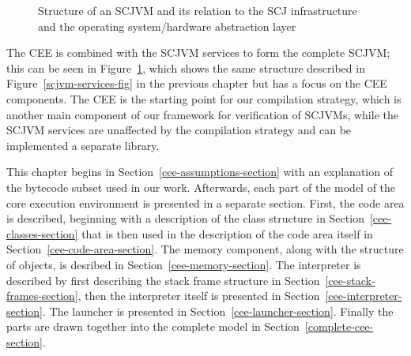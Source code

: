 \documentclass[a4paper,10pt]{report}
\begin{document}
\begin{figure}[ht]
  \caption{Structure of an SCJVM and its relation to the SCJ
    infrastructure and the operating system/hardware abstraction
    layer}
  \label{cee-fig}
\end{figure}

The CEE is combined with the SCJVM services to form the complete
SCJVM; this can be seen in Figure~\ref{cee-fig}, which shows the same
structure described in Figure~\ref{scjvm-services-fig} in the previous
chapter but has a focus on the CEE components.
The CEE is the starting point for our compilation strategy, which is
another main component of our framework for verification of SCJVMs,
while the SCJVM services are unaffected by the compilation strategy
and can be implemented a separate library.

This chapter begins in Section~\ref{cee-assumptions-section} with an
explanation of the bytecode subset used in our work.
Afterwards, each part of the \Circus{} model of the core execution
environment is presented in a separate section.
First, the code area is described, beginning with a description of the
class structure in Section~\ref{cee-classes-section} that is then used
in the description of the code area itself in
Section~\ref{cee-code-area-section}.
The memory component, along with the structure of objects, is desribed
in Section~\ref{cee-memory-section}.
The interpreter is described by first describing the stack frame
structure in Section~\ref{cee-stack-frames-section}, then the
interpreter itself is presented in
Section~\ref{cee-interpreter-section}.
The launcher is presented in Section~\ref{cee-launcher-section}.
Finally the parts are drawn together into the complete model in
Section~\ref{complete-cee-section}.
\end{document}

